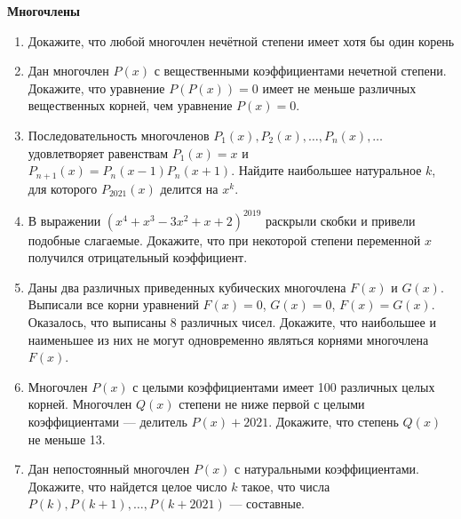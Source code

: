 \documentclass{article}
\begin{document}
\large
	

\begin{center}
\textbf{Многочлены}
\end{center}

\begin{enumerate}[label*=\protect\fbox{\arabic{enumi}}]
	
\item Докажите, что любой многочлен нечётной степени имеет хотя бы один корень

\item Дан многочлен $P(x)$ с вещественными коэффициентами нечетной степени. Докажите, что уравнение $P(P(x)) = 0$ имеет не меньше различных вещественных корней, чем уравнение $P(x) = 0$.

\item Последовательность многочленов $P_1(x), P_2(x), \ldots, P_n(x), \ldots$ удовлетворяет равенствам $P_1(x) = x$ и $P_{n+1}(x) = P_n(x - 1)P_n(x + 1)$. Найдите наибольшее натуральное $k$, для которого $P_{2021}(x)$ делится на $x^k$.

\item В выражении $(x^4 + x^3 - 3x^2 + x + 2)^{2019}$ раскрыли скобки и привели подобные слагаемые. Докажите, что при некоторой степени переменной $x$ получился отрицательный коэффициент.

\item Даны два различных приведенных кубических многочлена $F(x)$ и $G(x)$. Выписали все корни уравнений $F(x) = 0$, $G(x) = 0$, $F(x) = G(x)$. Оказалось, что выписаны 8 различных чисел. Докажите, что наибольшее и наименьшее из них не могут одновременно являться корнями многочлена $F(x)$.

\item Многочлен $P(x)$ с целыми коэффициентами имеет 100 различных целых корней. Многочлен $Q(x)$ степени не ниже первой с целыми коэффициентами — делитель $P(x) + 2021$. Докажите, что степень $Q(x)$ не меньше 13.

\item Дан непостоянный многочлен $P(x)$ с натуральными коэффициентами. Докажите, что найдется целое число $k$ такое, что числа $P(k), P(k+1), \ldots, P(k+2021)$ — составные.

%
%


\end{enumerate}
\end{document}
